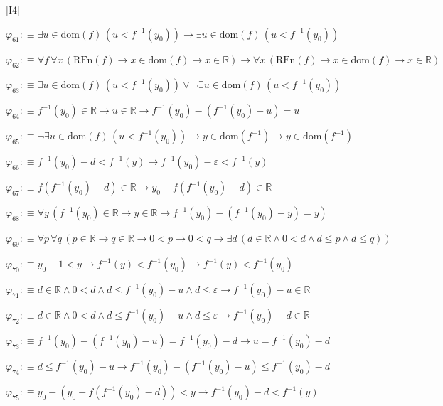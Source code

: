 \begin{fullproof}{[I4]}
\begin{abbrevlist}
\item $\varphi_{61} :\equiv \exists u \in \mathrm{dom}(f)\,(u < f^{-1}(y_{0})) \to \exists u \in \mathrm{dom}(f)\,(u < f^{-1}(y_{0}))$
\item $\varphi_{62} :\equiv \forall f\,\forall x\,(\mathrm{RFn}(f) \to x \in \mathrm{dom}(f) \to x \in \mathbb{R}) \to \forall x\,(\mathrm{RFn}(f) \to x \in \mathrm{dom}(f) \to x \in \mathbb{R})$
\item $\varphi_{63} :\equiv \exists u \in \mathrm{dom}(f)\,(u < f^{-1}(y_{0})) \lor \neg \exists u \in \mathrm{dom}(f)\,(u < f^{-1}(y_{0}))$
\item $\varphi_{64} :\equiv f^{-1}(y_{0}) \in \mathbb{R} \to u \in \mathbb{R} \to f^{-1}(y_{0}) - (f^{-1}(y_{0}) - u) = u$
\item $\varphi_{65} :\equiv \neg \exists u \in \mathrm{dom}(f)\,(u < f^{-1}(y_{0})) \to y \in \mathrm{dom}(f^{-1}) \to y \in \mathrm{dom}(f^{-1})$
\item $\varphi_{66} :\equiv f^{-1}(y_{0}) - d < f^{-1}(y) \to f^{-1}(y_{0}) - \varepsilon < f^{-1}(y)$
\item $\varphi_{67} :\equiv f(f^{-1}(y_{0}) - d) \in \mathbb{R} \to y_{0} - f(f^{-1}(y_{0}) - d) \in \mathbb{R}$
\item $\varphi_{68} :\equiv \forall y\,(f^{-1}(y_{0}) \in \mathbb{R} \to y \in \mathbb{R} \to f^{-1}(y_{0}) - (f^{-1}(y_{0}) - y) = y)$
\item $\varphi_{69} :\equiv \forall p\,\forall q\,(p \in \mathbb{R} \to q \in \mathbb{R} \to 0 < p \to 0 < q \to \exists d\,(d \in \mathbb{R} \land 0 < d \land d \leq p \land d \leq q))$
\item $\varphi_{70} :\equiv y_{0} - 1 < y \to f^{-1}(y) < f^{-1}(y_{0}) \to f^{-1}(y) < f^{-1}(y_{0})$
\item $\varphi_{71} :\equiv d \in \mathbb{R} \land 0 < d \land d \leq f^{-1}(y_{0}) - u \land d \leq \varepsilon \to f^{-1}(y_{0}) - u \in \mathbb{R}$
\item $\varphi_{72} :\equiv d \in \mathbb{R} \land 0 < d \land d \leq f^{-1}(y_{0}) - u \land d \leq \varepsilon \to f^{-1}(y_{0}) - d \in \mathbb{R}$
\item $\varphi_{73} :\equiv f^{-1}(y_{0}) - (f^{-1}(y_{0}) - u) = f^{-1}(y_{0}) - d \to u = f^{-1}(y_{0}) - d$
\item $\varphi_{74} :\equiv d \leq f^{-1}(y_{0}) - u \to f^{-1}(y_{0}) - (f^{-1}(y_{0}) - u) \leq f^{-1}(y_{0}) - d$
\item $\varphi_{75} :\equiv y_{0} - (y_{0} - f(f^{-1}(y_{0}) - d)) < y \to f^{-1}(y_{0}) - d < f^{-1}(y)$

\end{abbrevlist}
\end{fullproof}
